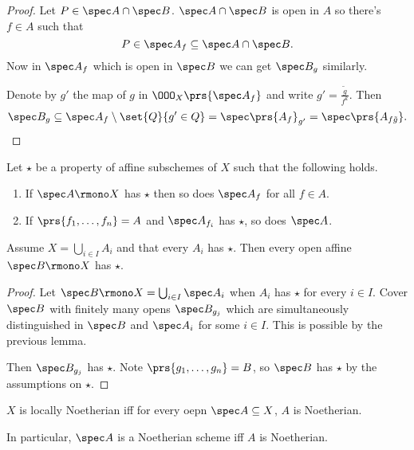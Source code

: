 \documentclass[10pt,a4paper,twoside,openany,hidelinks]{book}
\begin{document}
\begin{proof}
Let $P \in \spec A \cap \spec B$. $\spec A \cap \spec B$ is open in $A$ so there's $f \in A$ such that $$P \in \spec A_f \subseteq \spec A \cap \spec B\text{.}$$
Now in $\spec A_f$ which is open in $\spec B$ we can get $\spec B_g$ similarly.

Denote by $g'$ the map of $g$ in $\OOO_X\prs{\spec A_f}$ and write $g' = \frac{\tilde{g}}{f^k}$.
Then $$\spec B_g \subseteq \spec A_f \setminus \set{Q}{g' \in Q} = \spec\prs{A_f}_{g'} = \spec \prs{A_{f \tilde{g}}} \text{.}$$
\end{proof}

\begin{lemma}
Let $\star$ be a property of affine subschemes of $X$ such that the following holds.
\begin{enumerate}
    \item If $\spec A \rmono X$ has $\star$ then so does $\spec A_f$ for all $f \in A$.
    \item If $\prs{f_1, \ldots, f_n} = A$ and $\spec A_{f_i}$ has $\star$, so does $\spec A$.
\end{enumerate}
Assume $X = \bigcup_{i \in I} A_i$ and that every $A_i$ has $\star$. Then every open affine $\spec B \rmono X$ has $\star$.
\end{lemma}

\begin{proof}
Let $\spec B \rmono X = \bigcup_{i \in I} \spec A_i$ when $A_i$ has $\star$ for every $i \in I$.
Cover $\spec B$ with finitely many opens $\spec B_{g_j}$ which are simultaneously distinguished in $\spec B$ and $\spec A_i$ for some $i \in I$. This is possible by the previous lemma.

Then $\spec B_{g_j}$ has $\star$. Note $\prs{g_1, \ldots, g_n} = B$, so $\spec B$ has $\star$ by the assumptions on $\star$.
\end{proof}

\begin{proposition}
$X$ is locally Noetherian iff for every oepn $\spec A \subseteq X$, $A$ is Noetherian.

In particular, $\spec A$ is a Noetherian scheme iff $A$ is Noetherian.
\end{proposition}
\end{document}
